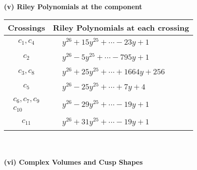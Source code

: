 \documentclass[1p]{elsarticle_modified}
\theoremstyle{definition}
\begin{document}
\newpage\renewcommand{\arraystretch}{1}
\flushleft \textbf{(v) Riley Polynomials at the component}\newline \\
\begin{tabular}{m{50pt}|m{274pt}}
Crossings & \hspace{64pt}Riley Polynomials at each crossing \\
\hline $$\begin{aligned}c_{1},c_{4}\end{aligned}$$&$\begin{aligned}
&y^{26}+15 y^{25}+\cdots-23 y+1
\end{aligned}$\\
\hline $$\begin{aligned}c_{2}\end{aligned}$$&$\begin{aligned}
&y^{26}-5 y^{25}+\cdots-795 y+1
\end{aligned}$\\
\hline $$\begin{aligned}c_{3},c_{8}\end{aligned}$$&$\begin{aligned}
&y^{26}+25 y^{25}+\cdots+1664 y+256
\end{aligned}$\\
\hline $$\begin{aligned}c_{5}\end{aligned}$$&$\begin{aligned}
&y^{26}-25 y^{25}+\cdots+7 y+4
\end{aligned}$\\
\hline $$\begin{aligned}c_{6},c_{7},c_{9}\\c_{10}\end{aligned}$$&$\begin{aligned}
&y^{26}-29 y^{25}+\cdots-19 y+1
\end{aligned}$\\
\hline $$\begin{aligned}c_{11}\end{aligned}$$&$\begin{aligned}
&y^{26}+31 y^{25}+\cdots-19 y+1
\end{aligned}$\\
\hline
\end{tabular}\\~\\
\newpage\flushleft \textbf{(vi) Complex Volumes and Cusp Shapes}
\end{document}

